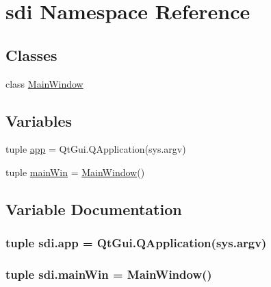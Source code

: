 \hypertarget{namespacesdi}{}\section{sdi Namespace Reference}
\label{namespacesdi}
\subsection*{Classes}
\begin{DoxyCompactItemize}
\item 
class \hyperlink{classsdi_1_1MainWindow}{Main\+Window}
\end{DoxyCompactItemize}
\subsection*{Variables}
\begin{DoxyCompactItemize}
\item 
tuple \hyperlink{namespacesdi_a1ae8932478ae1a4c4af837de4d5fabd3}{app} = Qt\+Gui.\+Q\+Application(sys.\+argv)
\item 
tuple \hyperlink{namespacesdi_a2cef5e507e4d9406eea89d921c03e80d}{main\+Win} = \hyperlink{classsdi_1_1MainWindow}{Main\+Window}()
\end{DoxyCompactItemize}


\subsection{Variable Documentation}
\hypertarget{namespacesdi_a1ae8932478ae1a4c4af837de4d5fabd3}{}
\subsubsection[{app}]{\setlength{\rightskip}{0pt plus 5cm}tuple sdi.\+app = Qt\+Gui.\+Q\+Application(sys.\+argv)}\label{namespacesdi_a1ae8932478ae1a4c4af837de4d5fabd3}
\hypertarget{namespacesdi_a2cef5e507e4d9406eea89d921c03e80d}{}
\subsubsection[{main\+Win}]{\setlength{\rightskip}{0pt plus 5cm}tuple sdi.\+main\+Win = {\bf Main\+Window}()}\label{namespacesdi_a2cef5e507e4d9406eea89d921c03e80d}
